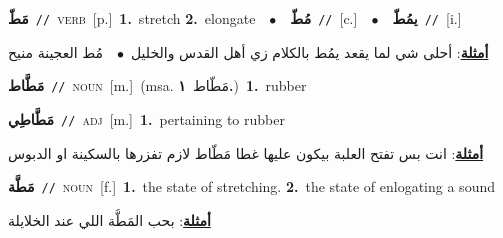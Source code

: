 \documentclass[10pt,a4paper,twoside]{article} %
\begin{document}
\begin{multicols}{2}
{\setlength\topsep{0pt}\textbf{\foreignlanguage{arabic}{مَطّ}}\ {\color{gray}\texttt{//}\color{black}}\ \textsc{verb}\ [p.]\ \textbf{1.}~stretch  \textbf{2.}~elongate\ \ $\bullet$\ \ \setlength\topsep{0pt}\textbf{\foreignlanguage{arabic}{مُطّ}}\ {\color{gray}\texttt{//}\color{black}}\ [c.]\ \ $\bullet$\ \ \setlength\topsep{0pt}\textbf{\foreignlanguage{arabic}{يمُطّ}}\ {\color{gray}\texttt{//}\color{black}}\ [i.]\  \begin{flushright}\color{gray}\foreignlanguage{arabic}{\textbf{\underline{\foreignlanguage{arabic}{أمثلة}}}: أحلى شي لما يقعد يمُط بالكلام زي أهل القدس والخليل\ $\bullet$\ \  مُط العجينة منيح}\end{flushright}\color{black}} \vspace{2mm}

{\setlength\topsep{0pt}\textbf{\foreignlanguage{arabic}{مَطَّاط}}\ {\color{gray}\texttt{//}\color{black}}\ \textsc{noun}\ [m.]\ \color{gray}(msa. \foreignlanguage{arabic}{مَطّاط}~\foreignlanguage{arabic}{\textbf{١.}})\color{black}\ \textbf{1.}~rubber\ } \vspace{2mm}

{\setlength\topsep{0pt}\textbf{\foreignlanguage{arabic}{مَطَّاطِي}}\ {\color{gray}\texttt{//}\color{black}}\ \textsc{adj}\ [m.]\ \textbf{1.}~pertaining to rubber\  \begin{flushright}\color{gray}\foreignlanguage{arabic}{\textbf{\underline{\foreignlanguage{arabic}{أمثلة}}}: انت بس تفتح العلبة بيكون عليها غطا مَطّاط لازم تفزرها بالسكينة او الدبوس}\end{flushright}\color{black}} \vspace{2mm}

{\setlength\topsep{0pt}\textbf{\foreignlanguage{arabic}{مَطَّة}}\ {\color{gray}\texttt{//}\color{black}}\ \textsc{noun}\ [f.]\ \textbf{1.}~the state of stretching.  \textbf{2.}~the state of enlogating a sound\  \begin{flushright}\color{gray}\foreignlanguage{arabic}{\textbf{\underline{\foreignlanguage{arabic}{أمثلة}}}: بحب المَطَّة اللي عند الخلايلة}\end{flushright}\color{black}} \vspace{2mm}


\end{multicols}
\end{document}
